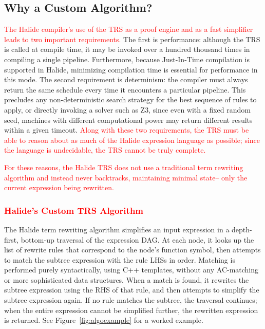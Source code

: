 \documentclass[acmsmall,review]{acmart}\settopmatter{printfolios=true,printccs=false,printacmref=false}
\newcommand{\modified}[1]{\textcolor{red}{{#1}}}
\begin{document}

\subsection{Why a Custom Algorithm?}

\modified{The Halide compiler's use of the TRS as a proof engine and as a fast simplifier
leads to two important requirements.}  
The first is performance: although the TRS is called at
compile time, it may be invoked over a hundred thousand times in compiling a single pipeline. 
Furthermore, because Just-In-Time compilation is supported in Halide,
minimizing compilation time is essential for performance in this mode.
The second requirement is determinism: the compiler must
always return the same schedule every time it encounters a particular pipeline.
This precludes any non-deterministic search strategy for the best sequence of
rules to apply, or directly invoking a solver such as Z3, since even with a
fixed random seed, machines with different computational power may return
different results within a given timeout.  \modified{Along with these two requirements,
the TRS must be able to reason about as much of the Halide expression language
as possible; since the language is undecidable, the TRS cannot be truly complete.}

\modified{For these reasons, the Halide TRS does not use a traditional term rewriting
algorithm and instead never backtracks, maintaining minimal state-- only the
current expression being rewritten.}

\subsubsection{\modified{Halide's Custom TRS Algorithm}}
\label{sec:customalgo}
The Halide term rewriting algorithm simplifies an input expression in a
depth-first, bottom-up traversal of the expression DAG. At each node, it looks
up the list of rewrite rules that correspond to the node's function symbol, then
attempts to match the subtree expression with the rule LHSs in order. Matching
is performed purely syntactically, using C++ templates, without any AC-matching
or more sophisticated data structures. When a match is found, it rewrites the
subtree expression using the RHS of that rule, and then attempts to simplify the
subtree expression again. If no rule matches the subtree, the traversal
continues; when the entire expression cannot be simplified further, the
rewritten expression is returned. See Figure~\ref{fig:algoexample} for a worked
example.
\end{document}
